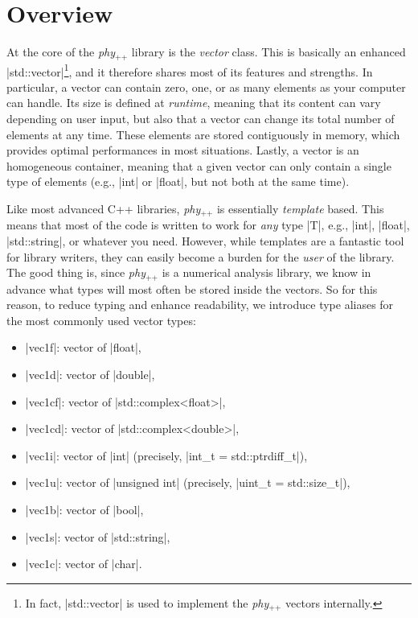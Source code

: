 \documentclass[12pt]{report}
\newcommand{\phypp}{\textit{phy}$_{\text{++}}$\xspace}
\newcommand{\stdvec}{\cppinline|std::vector|\xspace}
\begin{document}
\section{Overview \label{SEC:core:overview}}
At the core of the \phypp library is the \emph{vector} class. This is basically an enhanced \stdvec\footnote{In fact, \stdvec is used to implement the \phypp vectors internally.}, and it therefore shares most of its features and strengths. In particular, a vector can contain zero, one, or as many elements as your computer can handle. Its size is defined at \emph{runtime}, meaning that its content can vary depending on user input, but also that a vector can change its total number of elements at any time. These elements are stored contiguously in memory, which provides optimal performances in most situations. Lastly, a vector is an homogeneous container, meaning that a given vector can only contain a single type of elements (e.g., \cppinline|int| or \cppinline|float|, but not both at the same time).

Like most advanced C++ libraries, \phypp is essentially \emph{template} based. This means that most of the code is written to work for \emph{any} type \cppinline|T|, e.g., \cppinline|int|, \cppinline|float|, \cppinline|std::string|, or whatever you need. However, while templates are a fantastic tool for library writers, they can easily become a burden for the \emph{user} of the library. The good thing is, since \phypp is a numerical analysis library, we know in advance what types will most often be stored inside the vectors. So for this reason, to reduce typing and enhance readability, we introduce type aliases for the most commonly used vector types:
\begin{itemize}
\item \cppinline|vec1f|: vector of \cppinline|float|,
\item \cppinline|vec1d|: vector of \cppinline|double|,
\item \cppinline|vec1cf|: vector of \cppinline|std::complex<float>|,
\item \cppinline|vec1cd|: vector of \cppinline|std::complex<double>|,
\item \cppinline|vec1i|: vector of \cppinline|int| (precisely, \cppinline|int_t = std::ptrdiff_t|),
\item \cppinline|vec1u|: vector of \cppinline|unsigned int| (precisely, \cppinline|uint_t = std::size_t|),
\item \cppinline|vec1b|: vector of \cppinline|bool|,
\item \cppinline|vec1s|: vector of \cppinline|std::string|,
\item \cppinline|vec1c|: vector of \cppinline|char|.
\end{itemize}
\end{document}
